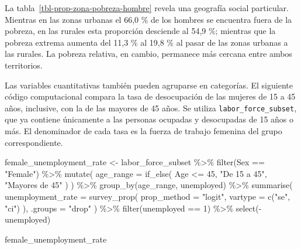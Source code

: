 \documentclass[
  spanish,
  11pt,
  letterpaper,
  oneside,
  open=any]{scrbook}
\newenvironment{Shaded}{\begin{snugshade}}{\end{snugshade}}
\newcommand{\AttributeTok}[1]{\textcolor[rgb]{0.40,0.45,0.13}{#1}}
\newcommand{\DecValTok}[1]{\textcolor[rgb]{0.68,0.00,0.00}{#1}}
\newcommand{\FunctionTok}[1]{\textcolor[rgb]{0.28,0.35,0.67}{#1}}
\newcommand{\NormalTok}[1]{\textcolor[rgb]{0.00,0.23,0.31}{#1}}
\newcommand{\OtherTok}[1]{\textcolor[rgb]{0.00,0.23,0.31}{#1}}
\newcommand{\SpecialCharTok}[1]{\textcolor[rgb]{0.37,0.37,0.37}{#1}}
\newcommand{\StringTok}[1]{\textcolor[rgb]{0.13,0.47,0.30}{#1}}
\begin{document}
La tabla~\ref{tbl-prop-zona-pobreza-hombre} revela una geografía social
particular. Mientras en las zonas urbanas el 66,0 \% de los hombres se
encuentra fuera de la pobreza, en las rurales esta proporción desciende
al 54,9 \%; mientras que la pobreza extrema aumenta del 11,3 \% al 19,8
\% al pasar de las zonas urbanas a las rurales. La pobreza relativa, en
cambio, permanece más cercana entre ambos territorios.

Las variables cuantitativas también pueden agruparse en categorías. El
siguiente código computacional compara la tasa de desocupación de las
mujeres de 15 a 45 años, inclusive, con la de las mayores de 45 años. Se
utiliza \texttt{labor\_force\_subset}, que ya contiene únicamente a las
personas ocupadas y desocupadas de 15 años o más. El denominador de cada
tasa es la fuerza de trabajo femenina del grupo correspondiente.

\begin{Shaded}
\begin{Highlighting}[]
\NormalTok{female\_unemployment\_rate }\OtherTok{\textless{}{-}}\NormalTok{ labor\_force\_subset }\SpecialCharTok{\%\textgreater{}\%}
  \FunctionTok{filter}\NormalTok{(Sex }\SpecialCharTok{==} \StringTok{"Female"}\NormalTok{) }\SpecialCharTok{\%\textgreater{}\%}
  \FunctionTok{mutate}\NormalTok{(}
    \AttributeTok{age\_range =} \FunctionTok{if\_else}\NormalTok{(}
\NormalTok{      Age }\SpecialCharTok{\textless{}=} \DecValTok{45}\NormalTok{,}
      \StringTok{"De 15 a 45"}\NormalTok{,}
      \StringTok{"Mayores de 45"}
\NormalTok{    )}
\NormalTok{  ) }\SpecialCharTok{\%\textgreater{}\%}
  \FunctionTok{group\_by}\NormalTok{(age\_range, unemployed) }\SpecialCharTok{\%\textgreater{}\%}
  \FunctionTok{summarise}\NormalTok{(}
    \AttributeTok{unemployment\_rate =} \FunctionTok{survey\_prop}\NormalTok{(}
      \AttributeTok{prop\_method =} \StringTok{"logit"}\NormalTok{,}
      \AttributeTok{vartype =} \FunctionTok{c}\NormalTok{(}\StringTok{"se"}\NormalTok{, }\StringTok{"ci"}\NormalTok{)}
\NormalTok{    ),}
    \AttributeTok{.groups =} \StringTok{"drop"}
\NormalTok{  ) }\SpecialCharTok{\%\textgreater{}\%}
  \FunctionTok{filter}\NormalTok{(unemployed }\SpecialCharTok{==} \DecValTok{1}\NormalTok{) }\SpecialCharTok{\%\textgreater{}\%}
  \FunctionTok{select}\NormalTok{(}\SpecialCharTok{{-}}\NormalTok{unemployed)}

\NormalTok{female\_unemployment\_rate}
\end{Highlighting}
\end{Shaded}
\end{document}
